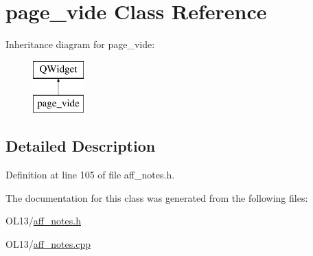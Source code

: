 \hypertarget{classpage__vide}{}\section{page\+\_\+vide Class Reference}
\label{classpage__vide}
Inheritance diagram for page\+\_\+vide\+:\begin{figure}[H]
\begin{center}
\leavevmode
\includegraphics[height=2.000000cm]{classpage__vide}
\end{center}
\end{figure}


\subsection{Detailed Description}


Definition at line 105 of file aff\+\_\+notes.\+h.



The documentation for this class was generated from the following files\+:\begin{DoxyCompactItemize}
\item 
O\+L13/\hyperlink{aff__notes_8h}{aff\+\_\+notes.\+h}\item 
O\+L13/\hyperlink{aff__notes_8cpp}{aff\+\_\+notes.\+cpp}\end{DoxyCompactItemize}
